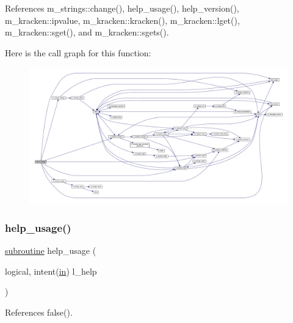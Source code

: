 References m\+\_\+strings\+::change(), help\+\_\+usage(), help\+\_\+version(), m\+\_\+kracken\+::ipvalue, m\+\_\+kracken\+::kracken(), m\+\_\+kracken\+::lget(), m\+\_\+kracken\+::sget(), and m\+\_\+kracken\+::sgets().

Here is the call graph for this function\+:
\nopagebreak
\begin{figure}[H]
\begin{center}
\leavevmode
\includegraphics[width=350pt]{change_8f90_a5fa62001f03b62e71cd6fa2a04f697b0_cgraph}
\end{center}
\end{figure}
\mbox{\label{change_8f90_a3e09a3b52ee8fb04eeb93fe5761626a8}} 
\subsubsection{\texorpdfstring{help\+\_\+usage()}{help\_usage()}}
{\footnotesize\ttfamily \hyperlink{M__stopwatch_83_8txt_acfbcff50169d691ff02d4a123ed70482}{subroutine} help\+\_\+usage (\begin{DoxyParamCaption}\item[{logical, intent(\hyperlink{M__journal_83_8txt_afce72651d1eed785a2132bee863b2f38}{in})}]{l\+\_\+help }\end{DoxyParamCaption})}



References false().

